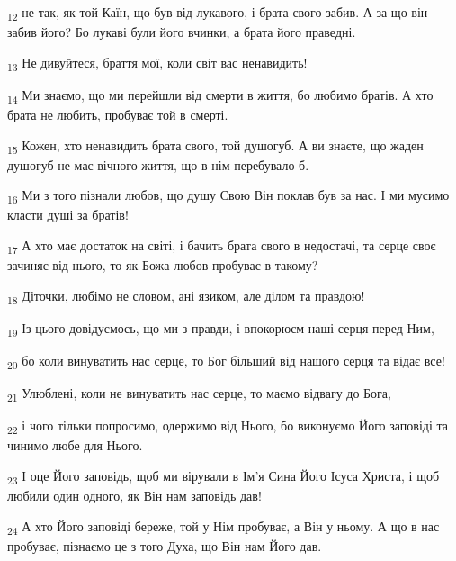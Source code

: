 \begin{tcolorbox}
\textsubscript{12} не так, як той Каїн, що був від лукавого, і брата свого забив. А за що він забив його? Бо лукаві були його вчинки, а брата його праведні.
\end{tcolorbox}
\begin{tcolorbox}
\textsubscript{13} Не дивуйтеся, браття мої, коли світ вас ненавидить!
\end{tcolorbox}
\begin{tcolorbox}
\textsubscript{14} Ми знаємо, що ми перейшли від смерти в життя, бо любимо братів. А хто брата не любить, пробуває той в смерті.
\end{tcolorbox}
\begin{tcolorbox}
\textsubscript{15} Кожен, хто ненавидить брата свого, той душогуб. А ви знаєте, що жаден душогуб не має вічного життя, що в нім перебувало б.
\end{tcolorbox}
\begin{tcolorbox}
\textsubscript{16} Ми з того пізнали любов, що душу Свою Він поклав був за нас. І ми мусимо класти душі за братів!
\end{tcolorbox}
\begin{tcolorbox}
\textsubscript{17} А хто має достаток на світі, і бачить брата свого в недостачі, та серце своє зачиняє від нього, то як Божа любов пробуває в такому?
\end{tcolorbox}
\begin{tcolorbox}
\textsubscript{18} Діточки, любімо не словом, ані язиком, але ділом та правдою!
\end{tcolorbox}
\begin{tcolorbox}
\textsubscript{19} Із цього довідуємось, що ми з правди, і впокорюєм наші серця перед Ним,
\end{tcolorbox}
\begin{tcolorbox}
\textsubscript{20} бо коли винуватить нас серце, то Бог більший від нашого серця та відає все!
\end{tcolorbox}
\begin{tcolorbox}
\textsubscript{21} Улюблені, коли не винуватить нас серце, то маємо відвагу до Бога,
\end{tcolorbox}
\begin{tcolorbox}
\textsubscript{22} і чого тільки попросимо, одержимо від Нього, бо виконуємо Його заповіді та чинимо любе для Нього.
\end{tcolorbox}
\begin{tcolorbox}
\textsubscript{23} І оце Його заповідь, щоб ми вірували в Ім'я Сина Його Ісуса Христа, і щоб любили один одного, як Він нам заповідь дав!
\end{tcolorbox}
\begin{tcolorbox}
\textsubscript{24} А хто Його заповіді береже, той у Нім пробуває, а Він у ньому. А що в нас пробуває, пізнаємо це з того Духа, що Він нам Його дав.
\end{tcolorbox}
